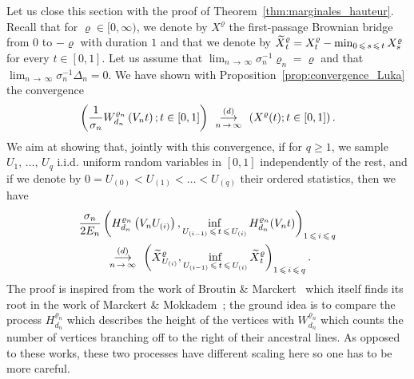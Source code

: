 \documentclass[AHL,Unicode,longabstracts,published]{cedram}
\newcommand{\1}{\ensembles{1}}
\newcommand{\tildep}[1]{\widetilde{#1}\vphantom{#1}}
\renewcommand{\le}{\leqslant}
\renewcommand{\ge}{\geqslant}
\newcommand{\Wfn}{W_{d_n}^{\varrho_n}}
\newcommand{\Hfn}{H_{d_n}^{\varrho_n}}
\newcommand{\tX}{\tildep{X}^{\varrho}}
\newcommand{\edges}{E}
\newcommand{\vertices}{V}
\newcommand{\cvloi}[1][n]{\enskip\mathop{\longrightarrow}^{(d)}_{#1\,\to\, \infty}\enskip}
\begin{document}
Let us close this section with the proof of Theorem~\ref{thm:marginales_hauteur}. Recall that for $\varrho \in [0,\infty)$, we denote by $X^\varrho$ the first-passage Brownian bridge from $0$ to $-\varrho$ with duration $1$ and that we denote by $\tX_t = X^\varrho_t - \min_{0\,\le\,s\,\le\,t} X^\varrho_s$ for every $t \in [0,1]$. Let us assume that $\lim_{n\,\to\,\infty} \sigma_n^{-1} \varrho_n = \varrho$ and that $\lim_{n\,\to\,\infty} \sigma_n^{-1} \Delta_n = 0$. We have shown with Proposition~\ref{prop:convergence_Luka} the convergence
\[
\left(\frac{1}{\sigma_n} \Wfn\left(\vertices_n t\right) ; t \in [0,1]\right)
\cvloi
\left(X^\varrho(t) ; t \in [0,1]\right).
\]
We aim at showing that, jointly with this convergence, if for $q \ge 1$, we sample $U_1,\,\dots,\,U_q$ i.i.d. uniform random variables in $[0,1]$ independently of the rest, and if we denote by $0 = U_{(0)} < U_{(1)} < \dots < U_{(q)}$ their ordered statistics, then we have
\begin{multline*}
\frac{\sigma_n}{2 \edges_n} \left(\Hfn\left(\vertices_n U_{(i)}\right), \inf_{U_{(i-1)}\,\le\,t\,\le\,U_{(i)}} \Hfn(\vertices_n t)\right)_{1\,\le\,i\,\le\,q}\\
\cvloi
\left(\tX_{U_{(i)}}, \inf_{U_{(i-1)}\,\le\,t\,\le\, U_{(i)}} \tX_t\right)_{1\,\le\,i\,\le\,q}.
\end{multline*}
The proof is inspired from the work of Broutin \& Marckert~\cite{BM14} which itself finds its root in the work of Marckert \& Mokkadem~\cite{MM03}; the ground idea is to compare the process $\Hfn$ which describes the height of the vertices with $\Wfn$ which counts the number of vertices branching off to the right of their ancestral lines. As opposed to these works, these two processes have different scaling here so one has to be more careful.
\end{document}
